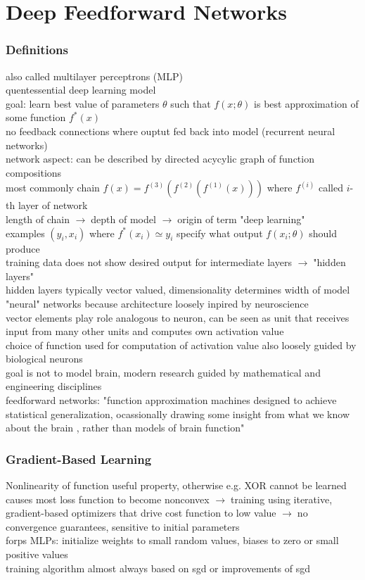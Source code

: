 \documentclass{article}
\newcommand{\arrow}{$\rightarrow\;$}
\begin{document}
\section*{Deep Feedforward Networks}
\subsubsection*{Definitions}
also called multilayer perceptrons (MLP) \\
quentessential deep learning model \\
goal: learn best value of parameters $\theta$ such that $f(x; \theta)$ is best approximation of some function $f^*(x)$ \\
no feedback connections where ouptut fed back into model (recurrent neural networks) \\
network aspect: can be described by directed acycylic graph of function compositions \\
most commonly chain $f(x) = f^{(3)}(f^{(2)}(f^{(1)}(x)))$ where $f^{(i)}$ called $i$-th layer of network \\
length of chain \arrow depth of model \arrow origin of term "deep learning" \\
examples $(y_i, x_i)$ where $f^*(x_i) \simeq y_i$ specify what output $f(x_i; \theta)$ should produce \\
training data does not show desired output for intermediate layers \arrow "hidden layers" \\
hidden layers typically vector valued, dimensionality determines width of model \\
"neural" networks because architecture loosely inpired by neuroscience \\
vector elements play role analogous to neuron, can be seen as unit that receives input from many 
other units and computes own activation value \\
choice of function used for computation of activation value also loosely guided by biological neurons \\
goal is not to model brain, modern research guided by mathematical and engineering disciplines \\
feedforward networks: "function approximation machines designed to achieve statistical generalization, ocassionally drawing
some insight from what we know about the brain , rather than models of brain function" %

\subsubsection*{Gradient-Based Learning}
Nonlinearity of function useful property, otherwise e.g. XOR cannot be learned \\
causes most loss function to become nonconvex \arrow training using iterative, gradient-based optimizers 
that drive cost function to low value \arrow no convergence guarantees, sensitive to initial parameters \\
forps MLPs: initialize weights to small random values, biases to zero or small positive values \\
training algorithm almost always based on sgd or improvements of sgd
\end{document}
